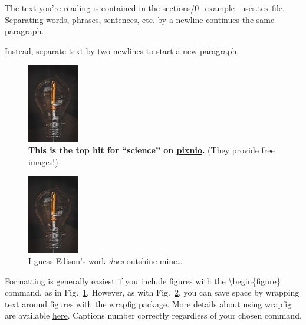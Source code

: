 The text you're reading is contained in the sections/0\_example\_uses.tex file. 
Separating 
words, 
phrases, 
sentences, 
etc.
by 
a 
newline 
continues
the 
same 
paragraph. 

Instead, separate text by two newlines to start a new paragraph.

\begin{figure}[H] %
    \centering
    \includegraphics[width=0.2\textwidth]{figures/lightbulb.jpeg}
    \caption{
    \textbf{This is the top hit for ``science'' on \href{https://pixnio.com/?s=science}{pixnio}.} (They provide free images!)
    }
    \label{fig:figure_name}
\end{figure}

\begin{figure}
    \begin{center} 
        \includegraphics[width=0.2\textwidth]{figures/lightbulb.jpeg}
    \end{center}
    \caption{I guess Edison's work \textit{does} outshine mine\ldots }
    \label{fig:wrapped_figure}
\end{figure}
Formatting is generally easiest if you include figures with the \textbackslash begin\{figure\} command, as in Fig.~\ref{fig:figure_name}. However, as with Fig.~\ref{fig:wrapped_figure}, you can save space by wrapping text around figures with the wrapfig package. More details about using wrapfig are available \href{https://www.overleaf.com/learn/latex/Wrapping_text_around_figures}{here}. Captions number correctly regardless of your chosen command. 
 
